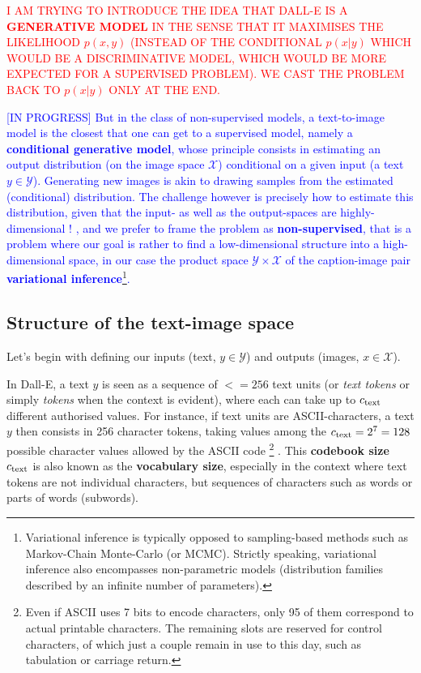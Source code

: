 \documentclass{article}
\begin{document}
\begin{appendix}
\textcolor{red}{I AM TRYING TO INTRODUCE THE IDEA THAT DALL-E IS A \textbf{GENERATIVE MODEL} IN THE SENSE THAT IT MAXIMISES THE LIKELIHOOD $p(x,y)$ (INSTEAD OF THE CONDITIONAL $p(x|y)$ WHICH WOULD BE A DISCRIMINATIVE MODEL, WHICH WOULD BE MORE EXPECTED FOR A SUPERVISED PROBLEM). WE CAST THE PROBLEM BACK TO $p(x|y)$ ONLY AT THE END.}


\textcolor{blue}{
[IN PROGRESS]
But in the class of non-supervised models, a text-to-image model is the closest that one can get to a supervised model, namely a \textbf{conditional generative model}, whose principle consists in estimating an output distribution (on the image space $\mathcal{X}$) conditional on a given input (a text $y\in\mathcal{Y}$).
Generating new images is akin to drawing samples from the estimated (conditional) distribution.
The challenge however is precisely how to estimate this distribution, given that the input- as well as the output-spaces are highly-dimensional !
, and we prefer to frame the problem as \textbf{non-supervised}, that is a problem where our goal is rather to find a low-dimensional structure into a high-dimensional space, in our case the product space $\mathcal{Y} \times \mathcal{X}$ of the caption-image pair
\textbf{variational inference}\footnote{Variational inference is typically opposed to sampling-based methods such as Markov-Chain Monte-Carlo (or MCMC). Strictly speaking, variational inference also encompasses non-parametric models (distribution families described by an infinite number of parameters).}.
}

\subsection{Structure of the text-image space}

Let's begin with defining our inputs (text, $y \in \mathcal{Y}$) and outputs (images, $x\in\mathcal{X}$).

In Dall-E, a text $y$ is seen as a sequence of $\lt=256$ text units (or \emph{text tokens} or simply \emph{tokens} when the context is evident), where each can take up to ${c_{\mathrm{text}}}$ different authorised values.
For instance, if text units are ASCII-characters, a text $y$ then consists in 256 character tokens, taking values among the ${c_{\mathrm{text}}}=2^7=128$ possible character values allowed by the ASCII code
    \footnote{
    Even if ASCII uses 7 bits to encode characters, only 95 of them correspond to actual printable characters.
    The remaining slots are reserved for control characters, of which just a couple remain in use to this day, such as tabulation or carriage return.
    }
.
This \textbf{codebook size} ${c_{\mathrm{text}}}$ is also known as the \textbf{vocabulary size}, especially in the context where text tokens are not individual characters, but sequences of characters such as words or parts of words (subwords).


\end{appendix}
\end{document}
